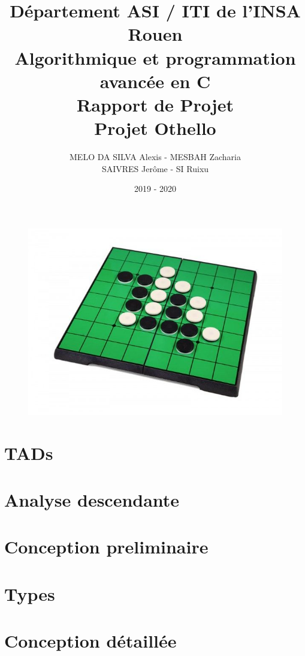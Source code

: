 \documentclass[french]{extarticle}
\begin{document}
\title{Département ASI / ITI de l'INSA Rouen \\
	Algorithmique et programmation avancée en C\\
	Rapport de Projet\\
	Projet Othello}
\author{MELO DA SILVA Alexis - MESBAH Zacharia\\
SAIVRES Jerôme - SI Ruixu}
\date{2019 - 2020}
\maketitle
\begin{figure}[h]
	\centering
	\includegraphics[width=12cm]{./sourcesIMAGES/othello.jpg}
  \end{figure}
\newpage
\tableofcontents
\newpage
\section{TADs}

\newpage
\section{Analyse descendante}

\newpage
\section{Conception preliminaire}



\newpage
\section{Types}

\newpage
\section{Conception détaillée}









\end{document}
